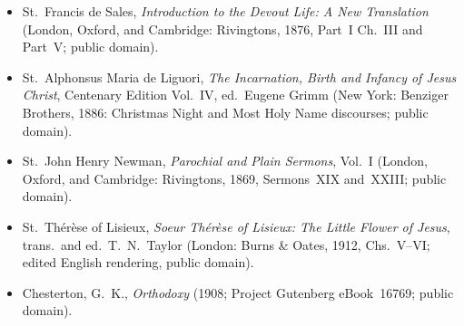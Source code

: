 \begin{itemize}
David Lewis, rev.\ Benedict Zimmerman, O.C.D.\ (London: Thomas Baker, 1904,
Ch.~VI \S\S\,9--12, Ch.~XXII \S\S\,1--5, Ch.~XXXIV \S\,2; public domain).
\item St.~Francis de Sales, \textit{Introduction to the Devout Life: A New
Translation} (London, Oxford, and Cambridge: Rivingtons, 1876, Part~I Ch.~III
and Part~V; public domain).
\item St.~Alphonsus Maria de Liguori, \textit{The Incarnation, Birth and Infancy
of Jesus Christ}, Centenary Edition Vol.~IV, ed.\ Eugene Grimm (New York:
Benziger Brothers, 1886: Christmas Night and Most Holy Name discourses; public
domain).
\item St.~John Henry Newman, \textit{Parochial and Plain Sermons}, Vol.~I
(London, Oxford, and Cambridge: Rivingtons, 1869, Sermons~XIX and~XXIII; public
domain).
\item St.~Th\'er\`ese of Lisieux, \textit{Soeur Th\'er\`ese of Lisieux: The
Little Flower of Jesus}, trans.\ and ed.\ T.~N.~Taylor (London: Burns \& Oates,
1912, Chs.~V--VI; edited English rendering, public domain).
\item Chesterton, G.~K., \textit{Orthodoxy} (1908; Project Gutenberg
eBook~16769; public domain).
\end{itemize}
